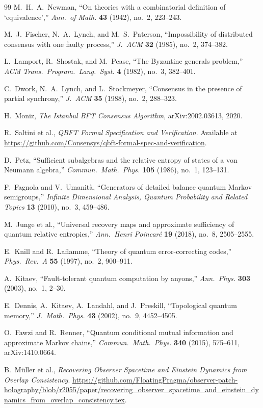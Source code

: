 \documentclass[11pt]{article}
\theoremstyle{remark}
\theoremstyle{plain}
\begin{document}
\begin{thebibliography}{99}
M.~H.~A.~Newman,
``On theories with a combinatorial definition of `equivalence',''
\emph{Ann.\ of Math.} \textbf{43} (1942), no.~2, 223--243.

M.~J.~Fischer, N.~A.~Lynch, and M.~S.~Paterson,
``Impossibility of distributed consensus with one faulty process,''
\emph{J.\ ACM} \textbf{32} (1985), no.~2, 374--382.

L.~Lamport, R.~Shostak, and M.~Pease,
``The Byzantine generals problem,''
\emph{ACM Trans.\ Program.\ Lang.\ Syst.} \textbf{4} (1982), no.~3, 382--401.

C.~Dwork, N.~A.~Lynch, and L.~Stockmeyer,
``Consensus in the presence of partial synchrony,''
\emph{J.\ ACM} \textbf{35} (1988), no.~2, 288--323.

H.~Moniz,
\emph{The Istanbul BFT Consensus Algorithm},
arXiv:2002.03613, 2020.

R.~Saltini et al.,
\emph{QBFT Formal Specification and Verification}.
Available at \url{https://github.com/Consensys/qbft-formal-spec-and-verification}.

D.~Petz,
``Sufficient subalgebras and the relative entropy of states of a von Neumann algebra,''
\emph{Commun.\ Math.\ Phys.} \textbf{105} (1986), no.~1, 123--131.

F.~Fagnola and V.~Umanit\`a,
``Generators of detailed balance quantum Markov semigroups,''
\emph{Infinite Dimensional Analysis, Quantum Probability and Related Topics}
\textbf{13} (2010), no.~3, 459--486.

M.~Junge et al.,
``Universal recovery maps and approximate sufficiency of quantum relative entropies,''
\emph{Ann.\ Henri Poincar\'e} \textbf{19} (2018), no.~8, 2505--2555.

E.~Knill and R.~Laflamme,
``Theory of quantum error-correcting codes,''
\emph{Phys.\ Rev.\ A} \textbf{55} (1997), no.~2, 900--911.

A.~Kitaev,
``Fault-tolerant quantum computation by anyons,''
\emph{Ann.\ Phys.} \textbf{303} (2003), no.~1, 2--30.

E.~Dennis, A.~Kitaev, A.~Landahl, and J.~Preskill,
``Topological quantum memory,''
\emph{J.\ Math.\ Phys.} \textbf{43} (2002), no.~9, 4452--4505.

O.~Fawzi and R.~Renner,
``Quantum conditional mutual information and approximate Markov chains,''
\emph{Commun.\ Math.\ Phys.} \textbf{340} (2015), 575--611,
arXiv:1410.0664.

B.~M\"uller et al.,
\emph{Recovering Observer Spacetime and Einstein Dynamics from Overlap Consistency}.
\url{https://github.com/FloatingPragma/observer-patch-holography/blob/r2055/paper/recovering_observer_spacetime_and_einstein_dynamics_from_overlap_consistency.tex}.

\end{thebibliography}
\end{document}
